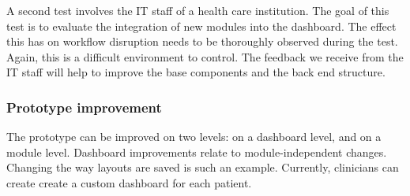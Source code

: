     A second test involves the IT staff of a health care institution. The goal of this test is to evaluate the integration of new modules into the dashboard. The effect this has on workflow disruption needs to be thoroughly observed during the test. Again, this is a difficult environment to control. The feedback we receive from the IT staff will help to improve the base components and the back end structure.
    
    \subsubsection{Prototype improvement}

    The prototype can be improved on two levels: on a dashboard level, and on a module level. Dashboard improvements relate to module-independent changes. Changing the way layouts are saved is such an example. Currently, clinicians can create create a custom dashboard for each patient. 

    

